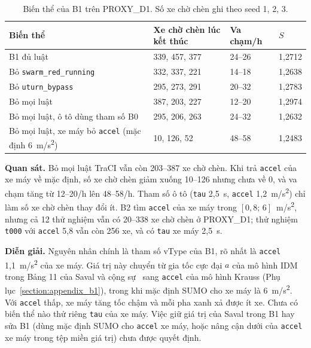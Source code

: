 \documentclass[../main.tex]{subfiles}
\begin{document}
\begin{table}[H]
\centering
\small
\caption{Biến thể của B1 trên PROXY\_D1. Số xe chờ chèn ghi theo seed 1, 2, 3.} \label{table:4.d1_backlog}
\begin{tabular}{|p{6.4cm}|p{3.0cm}|p{1.8cm}|p{1.4cm}|}
\hline
\textbf{Biến thể} & \textbf{Xe chờ chèn lúc kết thúc} & \textbf{Va chạm/h} & \textbf{$S$} \\ \hline
B1 đủ luật & 339, 457, 377 & 24--26 & 1,2712 \\ \hline
Bỏ \texttt{swarm\_red\_running} & 332, 337, 221 & 14--18 & 1,2638 \\ \hline
Bỏ \texttt{uturn\_bypass} & 295, 273, 291 & 20--32 & 1,2783 \\ \hline
Bỏ mọi luật & 387, 203, 227 & 12--20 & 1,2974 \\ \hline
Bỏ mọi luật, ô tô dùng tham số B0 & 295, 206, 263 & 24--32 & 1,2632 \\ \hline
Bỏ mọi luật, xe máy bỏ \texttt{accel} (mặc định 6~m/s\textsuperscript{2}) & 10, 126, 52 & 48--58 & 1,2483 \\ \hline
\end{tabular}
\end{table}

\textbf{Quan sát.} Bỏ mọi luật TraCI vẫn còn 203--387 xe chờ chèn. Khi trả \texttt{accel} của xe máy về mặc định, số xe chờ chèn giảm xuống 10--126 nhưng chưa về 0, và va chạm tăng từ 12--20/h lên 48--58/h. Tham số ô tô (\texttt{tau} 2,5~s, \texttt{accel} 1,2~m/s\textsuperscript{2}) chỉ làm số xe chờ chèn thay đổi ít. B2 tìm \texttt{accel} của xe máy trong $[0{,}8;\,6]$~m/s\textsuperscript{2}, nhưng cả 12 thử nghiệm vẫn có 20--338 xe chờ chèn ở PROXY\_D1; thử nghiệm \texttt{t000} với \texttt{accel} 5,8 vẫn còn 256 xe, và có \texttt{tau} xe máy 2,5~s.

\textbf{Diễn giải.} Nguyên nhân chính là tham số vType của B1, rõ nhất là \texttt{accel} 1,1~m/s\textsuperscript{2} của xe máy. Giá trị này chuyển từ gia tốc cực đại $a$ của mô hình IDM trong Bảng 11 của Saval và cộng sự~\cite{saval2023mixed} sang \texttt{accel} của mô hình Krauss (Phụ lục~\ref{section:appendix_b1}), trong khi mặc định SUMO cho xe máy là 6~m/s\textsuperscript{2}. Với \texttt{accel} thấp, xe máy tăng tốc chậm và mỗi pha xanh xả được ít xe. Chưa có biến thể nào thử riêng \texttt{tau} của xe máy. Việc giữ giá trị của Saval trong B1 hay sửa B1 (dùng mặc định SUMO cho \texttt{accel} xe máy, hoặc nâng cận dưới của \texttt{accel} xe máy trong tệp miền giá trị) chưa được quyết định.
\end{document}
